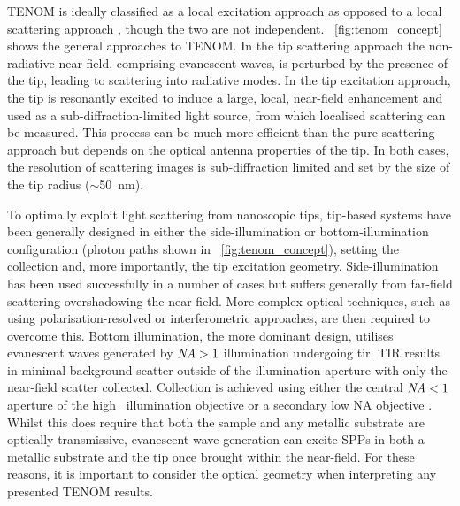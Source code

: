 \documentclass{article}
\begin{document}
TENOM is ideally classified as a local excitation approach as opposed to a local scattering approach \cite{novotny2006}, though the two are not independent. \figurename~\ref{fig:tenom_concept} shows the general approaches to TENOM. In the tip scattering approach the non-radiative near-field, comprising evanescent waves, is perturbed by the presence of the tip, leading to scattering into radiative modes. In the tip excitation approach, the tip is resonantly excited to induce a large, local, near-field enhancement and used as a sub-diffraction-limited light source, from which  localised scattering can be measured. This process can be much more efficient than the pure scattering approach but depends on the optical antenna properties of the tip. In both cases, the resolution of scattering images is sub-diffraction limited and set by the size of the tip radius ($\sim$\SI{50}{nm}).


To optimally exploit light scattering from nanoscopic tips, tip-based systems have been generally designed in either the side-illumination or bottom-illumination configuration (photon paths shown in \figurename~\ref{fig:tenom_concept}), setting the collection and, more importantly, the tip excitation geometry. Side-illumination has been used successfully in a number of cases \cite{mehtani2006, steidtner2007, zhang2013, wickramasinghe2014} but suffers generally from far-field scattering overshadowing the near-field. More complex optical techniques, such as using polarisation-resolved or interferometric approaches, are then required to overcome this. %
Bottom illumination, the more dominant design, utilises evanescent waves generated by $\mathit{NA}>1$ illumination undergoing \gls{tir}. TIR results in minimal background scatter outside of the illumination aperture with only the near-field scatter collected. Collection is achieved using either the central $\mathit{NA}<1$ aperture of the high \NA\ illumination objective \cite{hayazawa2001, yeo2006, yeo2007, zhang2013experimental, mino2014, kumar2014} or a secondary low NA objective \cite{hayazawa2007, taguchi2009, uetsuki2012}. Whilst this does require that both the sample and any metallic substrate are optically transmissive, evanescent wave generation can excite SPPs in both a metallic substrate and the tip once brought within the near-field. For these reasons, it is important to consider the optical geometry when interpreting any presented TENOM results.
\end{document}
